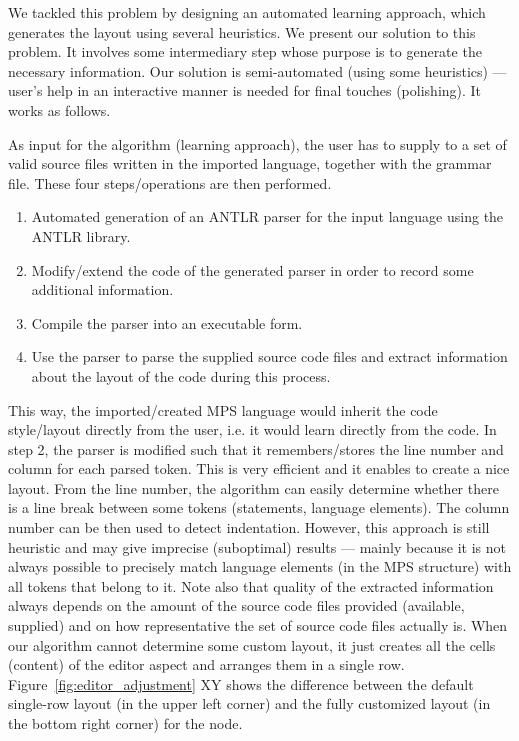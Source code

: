 We tackled this problem by designing an automated learning approach, which generates the layout using several heuristics.
We present our solution to this problem. It involves some intermediary step whose purpose is to generate the necessary information.
Our solution is semi-automated (using some heuristics) --- user's help in an interactive manner is needed for final touches (polishing).
It works as follows.

As input for the algorithm (learning approach), the user has to supply to a set of valid source files written in the imported language, together with the grammar file.
These four steps/operations are then performed.
\begin{enumerate}
	\item Automated generation of an ANTLR parser for the input language using the ANTLR library.
	\item Modify/extend the code of the generated parser in order to record some additional information.
	\item Compile the parser into an executable form.
	\item Use the parser to parse the supplied source code files and extract information about the layout of the code during this process.
\end{enumerate}
This way, the imported/created MPS language would inherit the code style/layout directly from the user, i.e. it would learn directly from the code.
In step 2, the parser is modified such that it remembers/stores the line number and column for each parsed token.
This is very efficient and it enables to create a nice layout.
From the line number, the algorithm can easily determine whether there is a line break between some tokens (statements, language elements).
The column number can be then used to detect indentation.
However, this approach is still heuristic and may give imprecise (suboptimal) results --- mainly because it is not always possible to precisely match language elements (in the MPS structure) with all tokens that belong to it.
Note also that quality of the extracted information always depends on the amount of the source code files provided (available, supplied) and on how representative the set of source code files actually is.
When our algorithm cannot determine some custom layout, it just creates all the cells (content) of the editor aspect and arranges them in a single row.
Figure~\ref{fig:editor_adjustment} XY shows the difference between the default single-row layout (in the upper left corner) and the fully customized layout (in the bottom right corner) for the  node.

